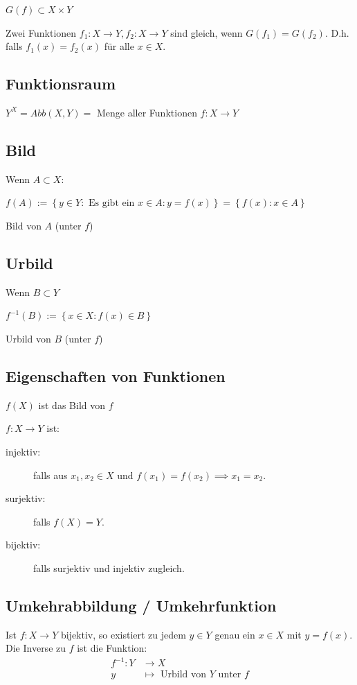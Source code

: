 \documentclass[fleqn]{scrbook}
\begin{document}
$G(f) \subset X \times Y$

Zwei Funktionen $f_1 : X \to Y, f_2 : X \to Y$ sind gleich, wenn $G(f_1) = G(f_2)$. D.h. falls $f_1(x)=f_2(x)$ für alle $x \in X$.

\subsection{Funktionsraum}

$Y^X = Abb(X,Y) = $ Menge aller Funktionen $f : X \to Y$

\subsection{Bild}

Wenn $A \subset X$:

$f(A):=\left\{ y \in Y : \text{ Es gibt ein } x \in A : y=f(x) 
\right\} =\left\{ f(x) : x \in A \right\}$

Bild von $A$ (unter $f$)

\subsection{Urbild}

Wenn $B \subset Y$ 

$f^{-1}(B):=\left\{ x \in X : f(x) \in B \right\}$

Urbild von $B$ (unter $f$)

\subsection{Eigenschaften von Funktionen}

$f(X)$ ist das Bild von $f$

$f : X \to Y$ ist:

\begin{description}
  \item[injektiv:] falls aus $x_1,x_2 \in X$ und $f(x_1)=f(x_2) \implies x_1=x_2$. 
  \item[surjektiv:] falls $f(X) = Y$.
  \item[bijektiv:] falls surjektiv und injektiv zugleich.
\end{description}

\subsection{Umkehrabbildung / Umkehrfunktion}
Ist $f : X \to Y$ bijektiv, so existiert zu jedem $y \in Y$ genau ein $x \in X$ mit $y =f(x)$. Die Inverse zu $f$ ist die Funktion: 
\begin{align*}
  f^{-1} : Y &\to X\\
  y &\mapsto \text{ Urbild von } Y \text{ unter } f
\end{align*}
\end{document}
